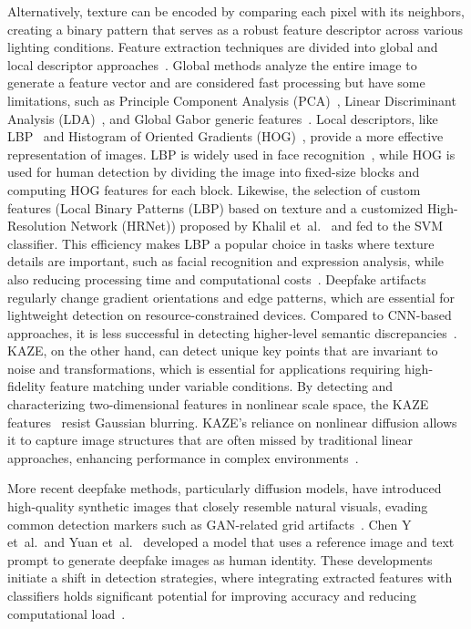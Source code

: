Alternatively, texture can be encoded by comparing each pixel with its neighbors, creating a binary pattern that serves as a robust feature descriptor across various lighting conditions. Feature extraction techniques are divided into global and local descriptor approaches~\cite{9760679}. Global methods analyze the entire image to generate a feature vector and are considered fast processing but have some limitations, such as Principle Component Analysis (PCA)~\cite{CAVALCANTI20134971}, Linear Discriminant Analysis (LDA)~\cite{lu2012incremental}, and Global Gabor generic features~\cite{fathi2016new}. Local descriptors, like LBP~\cite{topi2000robust} and Histogram of Oriented Gradients (HOG)~\cite{dalal2005histograms}, provide a more effective representation of images. LBP is widely used in face recognition~\cite{deniz2011face}, while HOG is used for human detection by dividing the image into fixed-size blocks and computing HOG features for each block. Likewise, the selection of custom features (Local Binary Patterns (LBP) based on texture and a customized High-Resolution Network (HRNet)) proposed by Khalil et~al.~\cite{khalil2021icaps} and fed to the SVM classifier. %
This efficiency makes LBP a popular choice in tasks where texture details are important, such as facial recognition and expression analysis, while also reducing processing time and computational costs~\cite{app14156567}. Deepfake artifacts regularly change gradient orientations and edge patterns, which are essential for lightweight detection on resource-constrained devices. Compared to CNN-based approaches, it is less successful in detecting higher-level semantic discrepancies~\cite{ASLAN2020107704}. KAZE, on the other hand, can detect unique key points that are invariant to noise and transformations, which is essential for applications requiring high-fidelity feature matching under variable conditions. By detecting and characterizing two-dimensional features in nonlinear scale space, the KAZE features~\cite{10.1007/978-3-642-33783-3_16} resist Gaussian blurring. KAZE’s reliance on nonlinear diffusion allows it to capture image structures that are often missed by traditional linear approaches, enhancing performance in complex environments~\cite{8464688}.

More recent deepfake methods, particularly diffusion models, have introduced high-quality synthetic images that closely resemble natural visuals, evading common detection markers such as GAN-related grid artifacts~\cite{Zotova2024}. Chen Y et~al.~and Yuan et~al.~\cite{chen2023text, yuan2023inserting} developed a model that uses a reference image and text prompt to generate deepfake images as human identity. These developments initiate a shift in detection strategies, where integrating extracted features with classifiers holds significant potential for improving accuracy and reducing computational load~\cite{ALMESTEKAWY2024100535, https://doi.org/10.1002/widm.1520, NASKAR2024e25933, Abhisheka_2023, Mohtavipour_2021}. 

